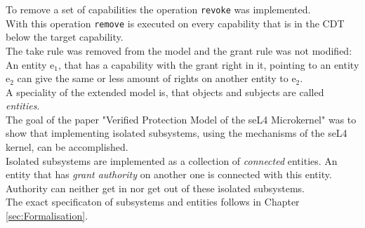 To remove a set of capabilities the operation \texttt{revoke} was implemented. \\ 
With this operation \texttt{remove} is executed on every capability that is in the CDT below the target capability. \\
The take rule was removed from the model and the grant rule was not modified: \\
An entity e$_1$, that has a capability with the grant right in it, pointing to an entity e$_2$ can give the same or less amount of rights on another entity to e$_2$. \\ 
A speciality of the extended model is, that objects and subjects are called \textit{entities}.\\
The goal of the paper "Verified Protection Model of the seL4 Microkernel" was to show that implementing isolated subsystems, using the mechanisms of the seL4 kernel, can be accomplished. \cite{TakeG} \\
Isolated subsystems are implemented as a collection of \textit{connected} entities. An entity that has \textit{grant authority} on another one is connected with this entity. Authority can neither get in nor get out of these isolated subsystems.\\
The exact specificaton of subsystems and entities follows in Chapter \ref{sec:Formalisation}.